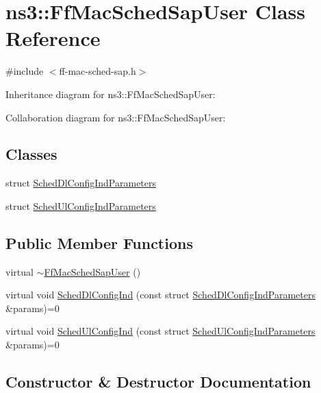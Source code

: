 \hypertarget{classns3_1_1FfMacSchedSapUser}{}\section{ns3\+:\+:Ff\+Mac\+Sched\+Sap\+User Class Reference}
\label{classns3_1_1FfMacSchedSapUser}


{\ttfamily \#include $<$ff-\/mac-\/sched-\/sap.\+h$>$}



Inheritance diagram for ns3\+:\+:Ff\+Mac\+Sched\+Sap\+User\+:


Collaboration diagram for ns3\+:\+:Ff\+Mac\+Sched\+Sap\+User\+:
\subsection*{Classes}
\begin{DoxyCompactItemize}
\item 
struct \hyperlink{structns3_1_1FfMacSchedSapUser_1_1SchedDlConfigIndParameters}{Sched\+Dl\+Config\+Ind\+Parameters}
\item 
struct \hyperlink{structns3_1_1FfMacSchedSapUser_1_1SchedUlConfigIndParameters}{Sched\+Ul\+Config\+Ind\+Parameters}
\end{DoxyCompactItemize}
\subsection*{Public Member Functions}
\begin{DoxyCompactItemize}
\item 
virtual \hyperlink{classns3_1_1FfMacSchedSapUser_a11db4c8bc4a72b76ceca35b8c7ae0519}{$\sim$\+Ff\+Mac\+Sched\+Sap\+User} ()
\item 
virtual void \hyperlink{classns3_1_1FfMacSchedSapUser_a28f8484af5a32a45ee6c0e51770d83f7}{Sched\+Dl\+Config\+Ind} (const struct \hyperlink{structns3_1_1FfMacSchedSapUser_1_1SchedDlConfigIndParameters}{Sched\+Dl\+Config\+Ind\+Parameters} \&params)=0
\item 
virtual void \hyperlink{classns3_1_1FfMacSchedSapUser_a1b89636256701a84d990db7db8aea874}{Sched\+Ul\+Config\+Ind} (const struct \hyperlink{structns3_1_1FfMacSchedSapUser_1_1SchedUlConfigIndParameters}{Sched\+Ul\+Config\+Ind\+Parameters} \&params)=0
\end{DoxyCompactItemize}


\subsection{Constructor \& Destructor Documentation}
